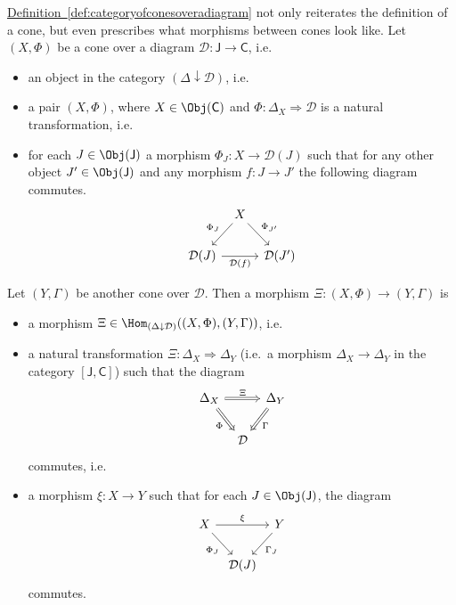 \documentclass[notes.tex]{subfiles}
\begin{document}
\hyperref[def:categoryofconesoveradiagram]{Definition~\ref*{def:categoryofconesoveradiagram}} not only reiterates the definition of a cone, but even prescribes what morphisms between cones look like. Let $(X, \Phi)$ be a cone over a diagram $\mathcal{D}\colon \mathsf{J} \rightarrow \mathsf{C}$, i.e.
\begin{itemize}
  \item an object in the category $(\Delta \downarrow \mathcal{D})$, i.e.
  \item a pair $(X, \Phi)$, where $X \in \Obj(\mathsf{C})$ and $\Phi\colon \Delta_{X} \Rightarrow \mathcal{D}$ is a natural transformation, i.e.
  \item for each $J \in \Obj(\mathsf{J})$ a morphism $\Phi_{J}\colon X \to \mathcal{D}(J)$ such that for any other object $J' \in \Obj(\mathsf{J})$ and any morphism $f\colon J \to J'$ the following diagram commutes.
    \begin{equation*}
      \begin{tikzcd}[column sep=tiny]
        & X
        \arrow[ld, swap, "\Phi_{J}"]
        \arrow[rd, "\Phi_{J'}"]
        \\
        \mathcal{D}(J)
        \arrow[rr, swap, "\mathcal{D}(f)"]
        & & \mathcal{D}(J')
      \end{tikzcd}
    \end{equation*}
\end{itemize}

Let $(Y, \Gamma)$ be another cone over $\mathcal{D}$. Then a morphism $\Xi\colon (X, \Phi) \to (Y, \Gamma)$ is
\begin{itemize}
  \item a morphism $\Xi \in \Hom_{(\Delta \downarrow \mathcal{D})}((X, \Phi), (Y, \Gamma))$, i.e.
  \item a natural transformation $\Xi\colon \Delta_{X} \Rightarrow \Delta_{Y}$ (i.e.\ a morphism $\Delta_{X} \to \Delta_{Y}$ in the category $[\mathsf{J}, \mathsf{C}]$) such that the diagram
    \begin{equation*}
      \begin{tikzcd}[column sep=tiny]
        \Delta_{X}
        \arrow[rr, Rightarrow, "\Xi"]
        \arrow[rd, swap, Rightarrow, "\Phi"]
        & &  \Delta_{Y}
        \arrow[ld, Rightarrow, "\Gamma"]
        \\
        & \mathcal{D}
      \end{tikzcd}
    \end{equation*}
    commutes, i.e.
  \item a morphism $\xi\colon X \to Y$ such that for each $J \in \Obj(\mathsf{J})$, the diagram
    \begin{equation*}
      \begin{tikzcd}[column sep=tiny]
        X
        \arrow[rr, "\xi"]
        \arrow[rd, swap, "\Phi_{J}"]
        & & Y
        \arrow[ld, "\Gamma_{J}"]
        \\
        & \mathcal{D}(J)
      \end{tikzcd}
    \end{equation*}
    commutes.
\end{itemize}
\end{document}
